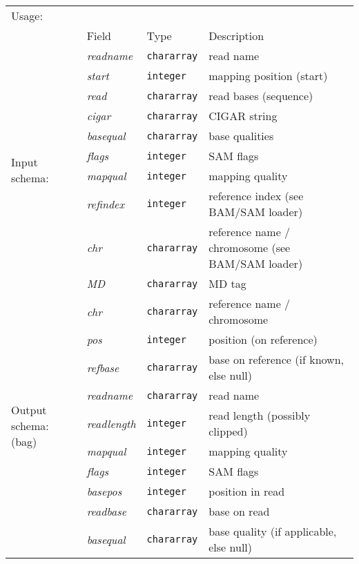 \begin{tabular}{lp{}p{}p{}}
Usage: & \multicolumn{3}{l}{}
\hspace*{-0.55cm}\begin{minipage}{0.9\textwidth}
  \begin{lstlisting}
  reads = load 'input.bam' using BamLoader('yes');
  bases = FOREACH reads GENERATE ReadSplit(name,start,read,cigar,basequal,flags,mapqual,refindex,refname,attributes#'MD');
  \end{lstlisting}
  \end{minipage}\hfill\kern-\arrayrulewidth
 \\[0.25cm]
& Field & Type & Description\\[0.1cm]
\multirow{10}{*}{Input schema:} & \emph{readname} & \texttt{chararray} & read name\\
& \emph{start} & \texttt{integer} & mapping position (start)\\
& \emph{read} & \texttt{chararray} & read bases (sequence)\\
& \emph{cigar} & \texttt{chararray} & CIGAR string\\
& \emph{basequal} & \texttt{chararray} & base qualities\\
& \emph{flags} & \texttt{integer} & SAM flags\\
& \emph{mapqual} & \texttt{integer} & mapping quality\\
& \emph{refindex} & \texttt{integer} & reference index (see BAM/SAM loader)\\ 
& \emph{chr} & \texttt{chararray} & reference name / chromosome (see BAM/SAM loader)\\
& \emph{MD} & \texttt{chararray} & MD tag\\\hline
\multirow{10}{*}{\parbox{2.2cm}{Output schema: (bag)}} & \emph{chr} & \texttt{chararray} & reference name / chromosome\\
& \emph{pos} & \texttt{integer} & position (on reference)\\
& \emph{refbase} & \texttt{chararray} & base on reference (if known, else null)\\
& \emph{readname} & \texttt{chararray} & read name\\
& \emph{readlength} & \texttt{integer} & read length (possibly clipped)\\
& \emph{mapqual} & \texttt{integer} & mapping quality\\
& \emph{flags} & \texttt{integer} & SAM flags\\
& \emph{basepos} & \texttt{integer} & position in read\\
& \emph{readbase} & \texttt{chararray} & base on read\\
& \emph{basequal} & \texttt{chararray} & base quality (if applicable, else null)
\end{tabular}

